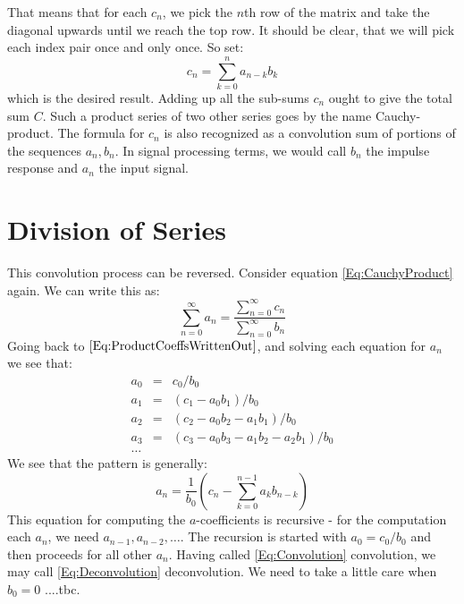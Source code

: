 That means that for each $c_n$, we pick the $n$th row of the matrix and take the diagonal upwards until we reach the top row. It should be clear, that we will pick each index pair once and only once. So set:
\begin{equation}
 \label{Eq:Convolution}
 c_n = \sum_{k=0}^{n} a_{n-k} b_k
\end{equation}
which is the desired result. Adding up all the sub-sums $c_n$ ought to give the total sum $C$. Such a product series of two other series goes by the name Cauchy-product. The formula for $c_n$ is also recognized as a convolution sum of portions of the sequences $a_n, b_n$. In signal processing terms, we would call $b_n$ the impulse response and $a_n$ the input signal.

\section{Division of Series}
This convolution process can be reversed. Consider equation \ref{Eq:CauchyProduct} again. We can write this as:
\begin{equation}
 \sum_{n=0}^{\infty} a_n = \frac{\sum_{n=0}^{\infty} c_n}{\sum_{n=0}^{\infty} b_n}
\end{equation}
Going back to $\ref{Eq:ProductCoeffsWrittenOut}$, and solving each equation for $a_n$ we see that:
\begin{equation}
 \begin{array}{ccl}
   a_0  & = &  c_0                                / b_0 \\ 
   a_1  & = & (c_1 - a_0 b_1)                     / b_0 \\ 
   a_2  & = & (c_2 - a_0 b_2 - a_1 b_1)           / b_0 \\ 
   a_3  & = & (c_3 - a_0 b_3 - a_1 b_2 - a_2 b_1) / b_0 \\ 
   \ldots
 \end{array}
\end{equation}
We see that the pattern is generally:
\begin{equation}
 \label{Eq:Deconvolution}
 a_n = \frac{1}{b_0} \left(c_n - \sum_{k=0}^{n-1} a_k b_{n-k} \right)
\end{equation}
This equation for computing the $a$-coefficients is recursive - for the computation each $a_n$, we need $a_{n-1}, a_{n-2}, \ldots$. The recursion is started with $a_0 = c_0/b_0$ and then proceeds for all other $a_n$. Having called \ref{Eq:Convolution} convolution, we may call \ref{Eq:Deconvolution} deconvolution. We need to take a little care when $b_0 = 0$ ....tbc.


